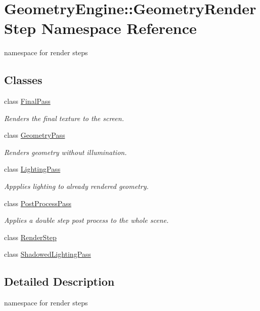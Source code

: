 \hypertarget{namespace_geometry_engine_1_1_geometry_render_step}{}\section{Geometry\+Engine\+::Geometry\+Render\+Step Namespace Reference}
\label{namespace_geometry_engine_1_1_geometry_render_step}


namespace for render steps  


\subsection*{Classes}
\begin{DoxyCompactItemize}
\item 
class \mbox{\hyperlink{class_geometry_engine_1_1_geometry_render_step_1_1_final_pass}{Final\+Pass}}
\begin{DoxyCompactList}\small\item\em Renders the final texture to the screen. \end{DoxyCompactList}\item 
class \mbox{\hyperlink{class_geometry_engine_1_1_geometry_render_step_1_1_geometry_pass}{Geometry\+Pass}}
\begin{DoxyCompactList}\small\item\em Renders geometry without illumination. \end{DoxyCompactList}\item 
class \mbox{\hyperlink{class_geometry_engine_1_1_geometry_render_step_1_1_lighting_pass}{Lighting\+Pass}}
\begin{DoxyCompactList}\small\item\em Appplies lighting to already rendered geometry. \end{DoxyCompactList}\item 
class \mbox{\hyperlink{class_geometry_engine_1_1_geometry_render_step_1_1_post_process_pass}{Post\+Process\+Pass}}
\begin{DoxyCompactList}\small\item\em Applies a double step post process to the whole scene. \end{DoxyCompactList}\item 
class \mbox{\hyperlink{class_geometry_engine_1_1_geometry_render_step_1_1_render_step}{Render\+Step}}
\item 
class \mbox{\hyperlink{class_geometry_engine_1_1_geometry_render_step_1_1_shadowed_lighting_pass}{Shadowed\+Lighting\+Pass}}
\end{DoxyCompactItemize}


\subsection{Detailed Description}
namespace for render steps 